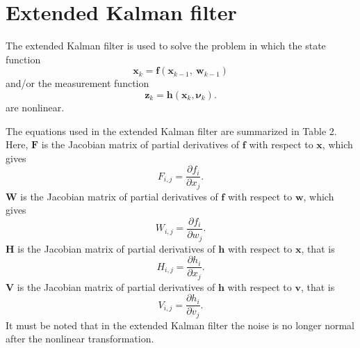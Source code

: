 \documentclass[12pt]{article}
\begin{document}

\section{Extended Kalman filter}\label{extended-kalman-filter}

The extended Kalman filter is used to solve the problem in which the state function
%
\begin{equation}
	\mathbf{x}_{k} = \mathbf{f}( \mathbf{x}_{k - 1},\ \mathbf{w}_{k - 1})
\end{equation}
and/or the measurement function
%
\begin{equation}
	\mathbf{z}_{k} = \mathbf{h}( \mathbf{x}_{k},\mathbf{\nu}_{k}).
\end{equation}
%
are nonlinear.

The equations used in the extended Kalman filter are summarized in Table 2. Here, \(\mathbf{F}\) is the Jacobian matrix of partial derivatives of \(\mathbf{f}\) with respect to \(\mathbf{x}\), which gives
%
\begin{equation}
	F_{i,j} = \frac{\partial f_{i}}{\partial x_{j}}.
\end{equation}
%
\(\mathbf{W}\) is the Jacobian matrix of partial derivatives of \(\mathbf{f}\) with respect to \(\mathbf{w}\), which gives
%
\begin{equation}
	W_{i,j} = \frac{\partial f_{i}}{\partial w_{j}}.
\end{equation}
%
\(\mathbf{H}\) is the Jacobian matrix of partial derivatives of \(\mathbf{h}\) with respect to \(\mathbf{x}\), that is
%
\begin{equation}
	H_{i,j} = \frac{\partial h_{i}}{\partial x_{j}}.
\end{equation}
%
\(\mathbf{V}\) is the Jacobian matrix of partial derivatives of \(\mathbf{h}\) with respect to \(\mathbf{v}\), that is
%
\begin{equation}
	V_{i,j} = \frac{\partial h_{i}}{\partial v_{j}}.
\end{equation}
%
It must be noted that in the extended Kalman filter the noise is no
longer normal after the nonlinear transformation.
\end{document}

